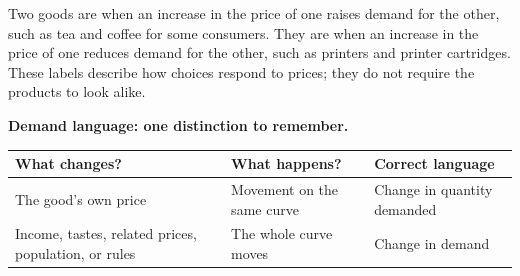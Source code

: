 Two goods are  when an increase in the price of one
raises demand for the other, such as tea and coffee for some consumers. They
are  when an increase in the price of one reduces demand
for the other, such as printers and printer cartridges. These labels describe
how choices respond to prices; they do not require the products to look alike.

\begin{samepage}
\begin{keyidea}
\textbf{Demand language: one distinction to remember.}
\begin{center}
\renewcommand{\arraystretch}{1.18}
\begin{tabular}{p{}p{}p{}}
\toprule
What changes? & What happens? & Correct language \\
\midrule
The good's own price & Movement on the same curve & Change in quantity demanded \\
Income, tastes, related prices, population, or rules & The whole curve moves & Change in demand \\
\bottomrule
\end{tabular}
\end{center}
\end{keyidea}
\end{samepage}

